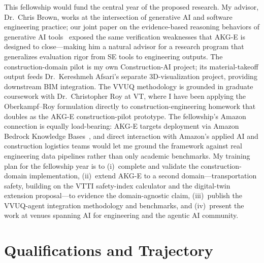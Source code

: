 \documentclass[conference, 10pt]{IEEEtran}
\begin{document}
This fellowship would fund the central year of the proposed research. My advisor, Dr.~Chris Brown, works at the intersection of generative AI and software engineering practice; our joint paper on the evidence-based reasoning behaviors of generative AI tools~\cite{BrownCusati2025SEBeliefs} exposed the same verification weaknesses that AKG-E is designed to close---making him a natural advisor for a research program that generalizes evaluation rigor from SE tools to engineering outputs. The construction-domain pilot is my own Construction-AI project; its material-takeoff output feeds Dr.~Kereshmeh Afsari's separate 3D-visualization project, providing downstream BIM integration. The VVUQ methodology is grounded in graduate coursework with Dr.~Christopher Roy at VT, where I have been applying the Oberkampf--Roy formulation directly to construction-engineering homework that doubles as the AKG-E construction-pilot prototype. The fellowship's Amazon connection is equally load-bearing: AKG-E targets deployment via Amazon Bedrock Knowledge Bases~\cite{AWSBedrockHybridSearch2024}, and direct interaction with Amazon's applied AI and construction logistics teams would let me ground the framework against real engineering data pipelines rather than only academic benchmarks. My training plan for the fellowship year is to (i)~complete and validate the construction-domain implementation, (ii)~extend AKG-E to a second domain---transportation safety, building on the VTTI safety-index calculator and the digital-twin extension proposal---to evidence the domain-agnostic claim, (iii)~publish the VVUQ-agent integration methodology and benchmarks, and (iv)~present the work at venues spanning AI for engineering and the agentic AI community.

\section*{Qualifications and Trajectory}
\end{document}
